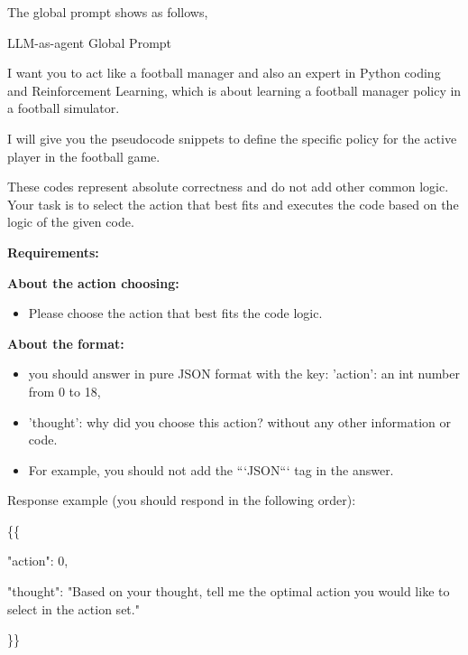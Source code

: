 The global prompt shows as follows,
\begin{gbox}{LLM-as-agent Global Prompt}

I want you to act like a football manager and also an expert in Python coding
and Reinforcement Learning, which is about learning a football manager policy in a football simulator. 

\hspace{5mm}


I will give you the pseudocode snippets to define the specific policy 
for the active player in the football game. 

\hspace{5mm}

These codes represent absolute correctness and do not add other common logic. 
Your task is to select the action that best fits and executes the code based on the logic of the given code.


\hspace{5mm}


\textbf{Requirements:}

\hspace{5mm}

\textbf{About the action choosing:}

\begin{itemize}
    \item Please choose the action that best fits the code logic.
\end{itemize}




\textbf{About the format:}


\begin{itemize}
    \item you should answer in pure JSON format with the key: 'action': an int number from 0 to 18, 
    \item 'thought': why did you choose this action? without any other information or code. 
    \item For example, you should not add the ```JSON``` tag in the answer.
\end{itemize}

        
Response example (you should respond in the following order):      

\hspace{5mm}

\{\{

\hspace{5mm}

    "action": 0,

    \hspace{5mm}
    
    "thought": "Based on your thought, tell me the optimal action you would like to select in the action set."

    \hspace{5mm}
    
\}\}


\end{gbox}




